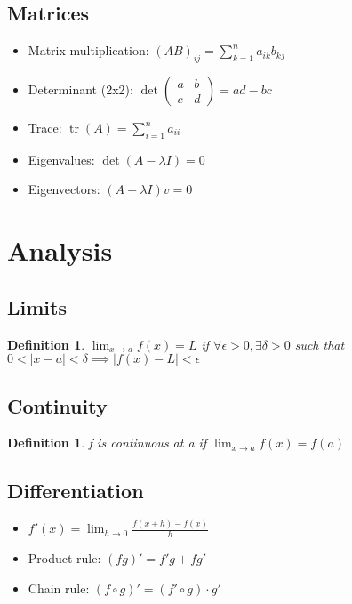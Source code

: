 \documentclass[10pt,a4paper,twocolumn]{article}
\newtheorem{definition}[theorem]{Definition}
\newcommand{\tr}{\operatorname{tr}}
\begin{document}
\subsection{Matrices}
\begin{itemize}[leftmargin=*]
\item Matrix multiplication: $(AB)_{ij} = \sum_{k=1}^n a_{ik} b_{kj}$
\item Determinant (2x2): $\det\begin{pmatrix}a & b \\ c & d\end{pmatrix} = ad - bc$
\item Trace: $\tr(A) = \sum_{i=1}^n a_{ii}$
\item Eigenvalues: $\det(A - \lambda I) = 0$
\item Eigenvectors: $(A - \lambda I)v = 0$
\end{itemize}

\section{Analysis}

\subsection{Limits}
\begin{definition}
$\lim_{x \to a} f(x) = L$ if $\forall \epsilon > 0, \exists \delta > 0$ such that $0 < |x - a| < \delta \implies |f(x) - L| < \epsilon$
\end{definition}

\subsection{Continuity}
\begin{definition}
f is continuous at a if $\lim_{x \to a} f(x) = f(a)$
\end{definition}

\subsection{Differentiation}
\begin{itemize}[leftmargin=*]
\item $f'(x) = \lim_{h \to 0} \frac{f(x+h) - f(x)}{h}$
\item Product rule: $(fg)' = f'g + fg'$
\item Chain rule: $(f \circ g)' = (f' \circ g) \cdot g'$
\end{itemize}
\end{document}
